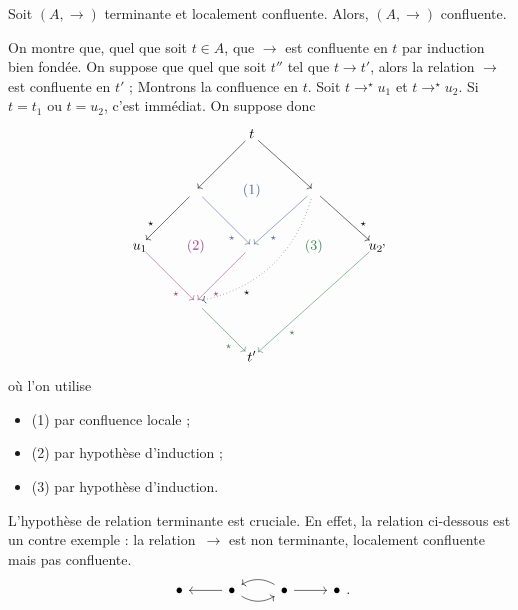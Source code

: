 \documentclass[../main]{subfiles}
\begin{document}
  \begin{lem}
    Soit $(A, \to)$ terminante et localement confluente.
    Alors, $(A, \to)$ confluente.
  \end{lem}
  \begin{prv}
    On montre que, quel que soit $t \in A$, que $\to$ est confluente en $t$ par induction bien fondée.
    On suppose que quel que  soit $t ''$ tel que $t \to t'$, alors la relation $\to$ est confluente en $t'$ ;
    Montrons la confluence en $t$.
    Soit $t\to^\star u_1$ et $t \to^\star u_2$.
    Si $t = t_1$ ou $t = u_2$, c'est immédiat.
    On suppose donc 
    \[
    \begin{tikzcd}[row sep={40,between origins}, column sep={40,between origins}]
      && \mathclap{t} \arrow{dr}{} \arrow{dl}{}\\
      &\arrow[near end,swap]{dl}{\star} \arrow[deepblue,near end,swap]{dr}{\star}& {\color{deepblue} \mathclap{(1)}}&\arrow[deepblue,near end]{dl}{\star} \arrow[near end]{dr}{\star} \arrow[bend left,near end, dotted]{ddll}{\star}\\
      \mathclap{u_1} \arrow[swap,deeppurple,near end]{dr}{\star} & {\color{deeppurple} \mathclap{(2)}} & \arrow[deeppurple,near end]{dl}{\star} & {\color{deepgreen} \mathclap{(3)}} & \mathclap{u_2} \arrow[deepgreen,near end]{ddll}{\star}\\
      &\arrow[swap,deepgreen,near end]{dr}{\star}\\
      &&\mathclap{t'}
    \end{tikzcd}
    ,\] 
    où l'on utilise 
    \begin{itemize}
      \item {\color{deepblue}(1)} par confluence locale ;
      \item {\color{deeppurple}(2)} par hypothèse d'induction ;
      \item {\color{deepgreen}(3)} par hypothèse d'induction.
    \end{itemize}
  \end{prv}

  \begin{rmk}
    L'hypothèse de relation terminante est cruciale.
    En effet, la relation ci-dessous est un contre exemple : la relation~$\to$ est non terminante, localement confluente mais pas confluente.
    \[
    \begin{tikzcd}
      \bullet&\arrow{l}{}\arrow[bend right]{r} \bullet&\arrow{r}{}\arrow[bend right]{l}{} \bullet&\bullet
    \end{tikzcd}
    .\]
  \end{rmk}
\end{document}
